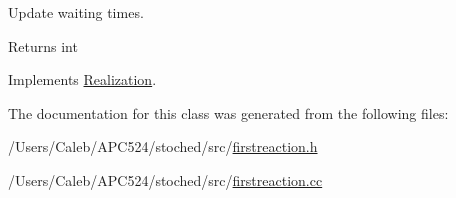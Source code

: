 Update waiting times. 

\begin{DoxyReturn}{Returns}
int 
\end{DoxyReturn}


Implements \hyperlink{class_realization_a9949217117927b149850288f3b74c9ef}{Realization}.



The documentation for this class was generated from the following files\+:\begin{DoxyCompactItemize}
\item 
/\+Users/\+Caleb/\+A\+P\+C524/stoched/src/\hyperlink{firstreaction_8h}{firstreaction.\+h}\item 
/\+Users/\+Caleb/\+A\+P\+C524/stoched/src/\hyperlink{firstreaction_8cc}{firstreaction.\+cc}\end{DoxyCompactItemize}

